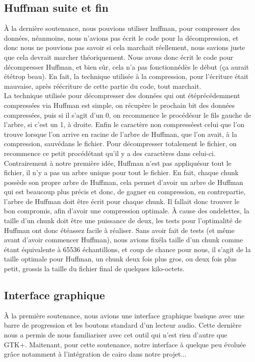 \documentclass[a4paper,12pt]{article}
\begin{document}
	\subsection{Huffman suite et fin}
À la derni\`ere soutenance, nous pouvions utiliser huffman, pour compresser des
donn\'ees, n\'eanmoins, nous n'avions pas \'ecrit le code pour la d\'ecompression, et
donc nous ne pouvions pas savoir si cela marchait r\'eellement, nous savions juste
que cela devrait marcher th\'eoriquement. Nous avons donc \'ecrit le code pour
d\'ecompresser Huffman, et bien sûr, cela n'a pas fonctionn\'ed\`es le d\'ebut (ça
aurait \'et\'etrop beau). En fait, la technique utilis\'ee à la compression, pour
l'\'ecriture \'etait mauvaise, apr\`es r\'e\'ecriture de cette partie du code, tout
marchait.\\
La technique utilis\'ee pour d\'ecompresser des donn\'ees qui ont \'et\'epr\'ec\'edemment
compress\'ees via Huffman est simple, on r\'ecup\`ere le prochain bit des donn\'ees
compress\'ees, puis si il s'agit d'un 0, on recommence le proc\'ed\'esur le fils
gauche de l'arbre, si c'est un 1, à droite. Enfin le caract\`ere non compress\'eest
celui que l'on trouve lorsque l'on arrive en racine de l'arbre de Huffman, que
l'on avait, à la compression, sauv\'edans le fichier. Pour d\'ecompresser
totalement le fichier, on recommence ce petit
proc\'ed\'etant qu'il y a des caract\`eres dans celui-ci.\\
Contrairement à notre premi\`ere id\'ee, Huffman n'est pas appliqu\'esur tout le
fichier, il n'y a pas un arbre unique pour tout le fichier. En fait, chaque
chunk poss\`ede son propre arbre de Huffman, cela permet d'avoir un arbre de
Huffman qui est beaucoup plus pr\'ecis et donc, de gagner en compression, en
contrepartie, l'arbre de
Huffman doit \^etre \'ecrit pour chaque chunk. Il fallait donc trouver le bon
compromis, afin d'avoir une compression optimale. À cause des ondelettes, la
taille d'un chunk doit \^etre une puissance de deux, les tests pour l'optimalit\'e
de Huffman ont donc \'et\'eassez facile à r\'ealiser. Sans avoir fait de tests (et
m\^eme avant d'avoir commencer Huffman), nous avions fix\'ela taille d'un chunk
comme \'etant \'equivalente à 65536 \'echantillons, et coup de chance pour nous, il
s'agit de la taille optimale pour Huffman, un chunk deux fois plus gros, ou deux
fois plus petit, grossis la taille du fichier final de quelques
kilo-octets.\\

\newpage

	\subsection{Interface graphique}
À la premi\`ere soutenance, nous avions une interface graphique basique avec une 
barre de progression et les boutons standard d'un lecteur audio. Cette derni\`ere 
nous a permis de nous familiariser avec cet outil qui n'est rien d'autre que 
GTK+. Maitenant, pour cette soutenance, notre interface à quelque peu \'evolu\'ee grâce 
notamment à l'int\'egration de cairo dans notre projet...
\end{document}
